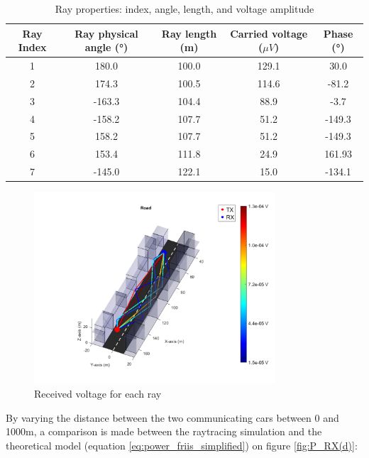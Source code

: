 \documentclass[10pt,a4paper]{ULBreport}
\begin{document}
\begin{table}[H]
    \centering
    \begin{tabular}{|c|c|c|c|c|}
        \hline
        Ray Index & Ray physical angle (°) & Ray length (m) & Carried voltage ($\mu V$) & Phase (°) \\ \hline
        1 & 180.0 & 100.0 & 129.1 & 30.0\\ \hline
        2 & 174.3 & 100.5 & 114.6 & -81.2\\ \hline
        3 & -163.3 & 104.4 & 88.9 & -3.7\\ \hline
        4 & -158.2 & 107.7 & 51.2 & -149.3\\ \hline
        5 & 158.2 & 107.7 & 51.2 & -149.3\\ \hline
        6 & 153.4 & 111.8 & 24.9 & 161.93\\ \hline
        7 & -145.0 & 122.1 & 15.0 & -134.1\\ \hline
    \end{tabular}
    \caption{Ray properties: index, angle, length, and voltage amplitude}
    \label{tab:ray_properties}
\end{table}

\begin{figure}[H]
    \centering
    \includegraphics[width=0.8\textwidth]{3_2.png}
    \caption{Received voltage for each ray}
    \label{fig:voltageDemo}
\end{figure}

By varying the distance between the two communicating cars between 0 and 1000m, a comparison is made between the raytracing simulation and the theoretical model (equation \ref{eq:power_friis_simplified}) on figure \ref{fig:P_RX(d)}:
\end{document}
